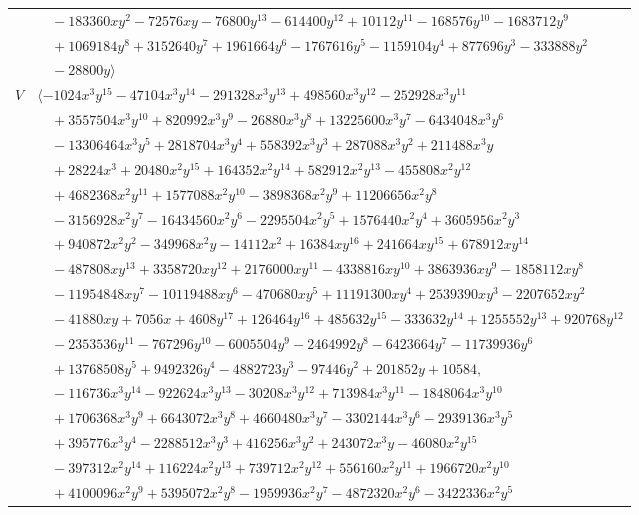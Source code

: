 \documentclass[11pt]{article}
\begin{document}
\begin{longtable}{@{}ll@{}}
 & $\quad -183360xy^{2}-72576xy-76800y^{13}-614400y^{12}+10112y^{11}-168576y^{10}-1683712y^{9}$\\
 & $\quad +1069184y^{8}+3152640y^{7}+1961664y^{6}-1767616y^{5}-1159104y^{4}+877696y^{3}-333888y^{2}$\\
 & $\quad -28800y\rangle$\\
$V$ & $\langle -1024x^{3}y^{15}-47104x^{3}y^{14}-291328x^{3}y^{13}+498560x^{3}y^{12}-252928x^{3}y^{11}$\\
 & $\quad +3557504x^{3}y^{10}+820992x^{3}y^{9}-26880x^{3}y^{8}+13225600x^{3}y^{7}-6434048x^{3}y^{6}$\\
 & $\quad -13306464x^{3}y^{5}+2818704x^{3}y^{4}+558392x^{3}y^{3}+287088x^{3}y^{2}+211488x^{3}y$\\
 & $\quad +28224x^{3}+20480x^{2}y^{15}+164352x^{2}y^{14}+582912x^{2}y^{13}-455808x^{2}y^{12}$\\
 & $\quad +4682368x^{2}y^{11}+1577088x^{2}y^{10}-3898368x^{2}y^{9}+11206656x^{2}y^{8}$\\
 & $\quad -3156928x^{2}y^{7}-16434560x^{2}y^{6}-2295504x^{2}y^{5}+1576440x^{2}y^{4}+3605956x^{2}y^{3}$\\
 & $\quad +940872x^{2}y^{2}-349968x^{2}y-14112x^{2}+16384xy^{16}+241664xy^{15}+678912xy^{14}$\\
 & $\quad -487808xy^{13}+3358720xy^{12}+2176000xy^{11}-4338816xy^{10}+3863936xy^{9}-1858112xy^{8}$\\
 & $\quad -11954848xy^{7}-10119488xy^{6}-470680xy^{5}+11191300xy^{4}+2539390xy^{3}-2207652xy^{2}$\\
 & $\quad -41880xy+7056x+4608y^{17}+126464y^{16}+485632y^{15}-333632y^{14}+1255552y^{13}+920768y^{12}$\\
 & $\quad -2353536y^{11}-767296y^{10}-6005504y^{9}-2464992y^{8}-6423664y^{7}-11739936y^{6}$\\
 & $\quad +13768508y^{5}+9492326y^{4}-4882723y^{3}-97446y^{2}+201852y+10584,$\\
 & $\quad -116736x^{3}y^{14}-922624x^{3}y^{13}-30208x^{3}y^{12}+713984x^{3}y^{11}-1848064x^{3}y^{10}$\\
 & $\quad +1706368x^{3}y^{9}+6643072x^{3}y^{8}+4660480x^{3}y^{7}-3302144x^{3}y^{6}-2939136x^{3}y^{5}$\\
 & $\quad +395776x^{3}y^{4}-2288512x^{3}y^{3}+416256x^{3}y^{2}+243072x^{3}y-46080x^{2}y^{15}$\\
 & $\quad -397312x^{2}y^{14}+116224x^{2}y^{13}+739712x^{2}y^{12}+556160x^{2}y^{11}+1966720x^{2}y^{10}$\\
 & $\quad +4100096x^{2}y^{9}+5395072x^{2}y^{8}-1959936x^{2}y^{7}-4872320x^{2}y^{6}-3422336x^{2}y^{5}$\\

\end{longtable}
\end{document}
